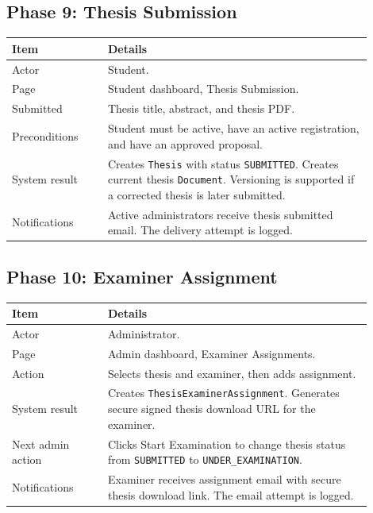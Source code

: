 \documentclass[11pt,a4paper]{article}
\newcommand{\status}[1]{\texttt{#1}}
\newcommand{\code}[1]{\texttt{#1}}
\begin{document}
\newpage

\subsection{Phase 9: Thesis Submission}

\begin{longtable}{p{0.24\linewidth} p{0.66\linewidth}}
\toprule
\textbf{Item} & \textbf{Details} \\
\midrule
Actor & Student. \\
Page & Student dashboard, Thesis Submission. \\
Submitted & Thesis title, abstract, and thesis PDF. \\
Preconditions & Student must be active, have an active registration, and have an approved proposal. \\
System result & Creates \code{Thesis} with status \status{SUBMITTED}. Creates current thesis \code{Document}. Versioning is supported if a corrected thesis is later submitted. \\
Notifications & Active administrators receive thesis submitted email. The delivery attempt is logged. \\
\bottomrule
\end{longtable}

\subsection{Phase 10: Examiner Assignment}

\begin{longtable}{p{0.24\linewidth} p{0.66\linewidth}}
\toprule
\textbf{Item} & \textbf{Details} \\
\midrule
Actor & Administrator. \\
Page & Admin dashboard, Examiner Assignments. \\
Action & Selects thesis and examiner, then adds assignment. \\
System result & Creates \code{ThesisExaminerAssignment}. Generates secure signed thesis download URL for the examiner. \\
Next admin action & Clicks Start Examination to change thesis status from \status{SUBMITTED} to \status{UNDER\_EXAMINATION}. \\
Notifications & Examiner receives assignment email with secure thesis download link. The email attempt is logged. \\
\bottomrule
\end{longtable}
\end{document}
